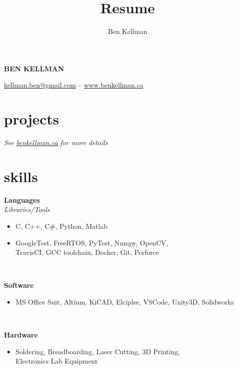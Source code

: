 \documentclass{article}
\author{Ben Kellman}
\title{Resume}
\newcommand{\grayhline}{
  \noindent\makebox[\linewidth]{\textcolor{gray}{\rule{0.95\textwidth}{1pt}}}\\
}
\newcommand{\minicolumns}[2]{
  \begin{minipage}[t]{0.25\textwidth}
    \begin{flushright}
      #1
    \end{flushright}
  \end{minipage}
  \hfill
  \begin{minipage}[t]{0.7\textwidth}
    #2
  \end{minipage}
}
\newcommand{\resumeSection}[3]{
  \minicolumns{
      \textbf{#1}\\
      \textit{#2}
    }
    {
      \begin{itemize}[leftmargin=*]
          \justifying
          \setlength\itemsep{-0.1em}
          #3
      \end{itemize}
  }
  \vspace{0.5\baselineskip}
}
\begin{document}
\begin{center}
  \textbf{\LARGE{\MakeUppercase{Ben Kellman}}}

  \vspace{0.75em}
  \underline{\href{mailto: kellman.ben@gmail.com}{kellman.ben@gmail.com}} -- \underline{\href{www.BenKellman.ca}{www.benkellman.ca}}

\end{center}
\vspace{1em}

\begin{minipage}[t]{0.65\textwidth}
  \section{projects}
  
  \textit{See \underline{\href{www.benkellman.ca}{benkellman.ca}} for more details}

  \section{skills}
  \resumeSection{Languages}{Libraries/Tools}{
    \item C, C++, C\#, Python, Matlab
    \item GoogleTest, FreeRTOS, PyTest, Numpy, OpenCV,\\
    TravisCI, GCC toolchain, Docker, Git, Perforce
  }

  \grayhline
  \resumeSection{Software}{}{
    \item MS Office Suit, Altium, KiCAD, Elciplse, VSCode, Unity3D, Solidworks
  }

  \grayhline
  \resumeSection{Hardware}{}{
    \item Soldering, Breadboarding, Laser Cutting, 3D Printing,\\
    Electronics Lab Equipment
  }

\end{minipage}
\end{document}
